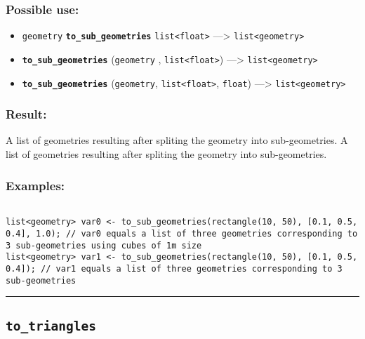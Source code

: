 \documentclass[]{book}
\providecommand{\tightlist}{%
  \setlength{\itemsep}{0pt}\setlength{\parskip}{0pt}}
\theoremstyle{definition}
\theoremstyle{definition}
\theoremstyle{definition}
\theoremstyle{remark}
\begin{document}
\subsubsection{Possible use:}\label{possible-use-524}

\begin{itemize}
\tightlist
\item
  \texttt{geometry} \textbf{\texttt{to\_sub\_geometries}}
  \texttt{list\textless{}float\textgreater{}} ---\textgreater{}
  \texttt{list\textless{}geometry\textgreater{}}
\item
  \textbf{\texttt{to\_sub\_geometries}} (\texttt{geometry} ,
  \texttt{list\textless{}float\textgreater{}}) ---\textgreater{}
  \texttt{list\textless{}geometry\textgreater{}}
\item
  \textbf{\texttt{to\_sub\_geometries}} (\texttt{geometry},
  \texttt{list\textless{}float\textgreater{}}, \texttt{float})
  ---\textgreater{} \texttt{list\textless{}geometry\textgreater{}}
\end{itemize}

\subsubsection{Result:}\label{result-506}

A list of geometries resulting after spliting the geometry into
sub-geometries. A list of geometries resulting after spliting the
geometry into sub-geometries.

\subsubsection{Examples:}\label{examples-362}

\begin{verbatim}
 
list<geometry> var0 <- to_sub_geometries(rectangle(10, 50), [0.1, 0.5, 0.4], 1.0); // var0 equals a list of three geometries corresponding to 3 sub-geometries using cubes of 1m size 
list<geometry> var1 <- to_sub_geometries(rectangle(10, 50), [0.1, 0.5, 0.4]); // var1 equals a list of three geometries corresponding to 3 sub-geometries
\end{verbatim}

\begin{center}\rule{0.5\linewidth}{\linethickness}\end{center}

\subsection{\texorpdfstring{\texttt{to\_triangles}}{to\_triangles}}\label{to_triangles}
\end{document}
